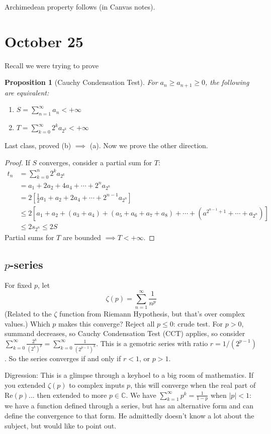 \documentclass{article}
\theoremstyle{plain}
\newtheorem{proposition}{Proposition}
\theoremstyle{remark}
\newcommand{\C}{{\mathbb C}}
\begin{document}
Archimedean property follows (in Canvas notes).

\section{October 25}
Recall we were trying to prove
\begin{proposition}[Cauchy Condensation Test]
	For $a_n \geq a_{n+1} \geq 0$, the following are equivalent:
	\begin{enumerate}
		\item $S = \sum_{n=1}^\infty a_n < + \infty$
		\item $T = \sum_{k=0}^\infty 2^ka_{2^k} < + \infty$
	\end{enumerate}
\end{proposition}
Last class, proved (b) $\implies$ (a). Now we prove the other direction.
\begin{proof}
	If $S$ converges,
	consider a partial sum for $T$:
	\begin{align*}
		t_n
		&= \sum_{k=0}^n 2^ka_{2^k}\\
		&= a_1 + 2a_2 + 4a_4 + \cdots + 2^na_{2^n}\\
		&= 2\left[\frac{1}{2}a_1 + a_2 + 2a_4 + \cdots + 2^{n-1}a_{2^n}\right]\\
		&\leq 2\left[a_1 + a_2 + (a_3 + a_4) + (a_5 + a_6 + a_7 + a_8)
		+ \cdots + (a^{2^{n-1}+1} + \cdots + a_{2^n})\right]\\
		&\leq 2s_{2^n} \leq 2S
	\end{align*}
	Partial sums for $T$ are bounded $\implies T < + \infty$.
\end{proof}
\subsection{$p$-series}
For fixed $p$, let
\[
	\zeta(p) = \sum_{n=1}^\infty \frac{1}{n^p}
\]
(Related to the $\zeta$ function from Riemann Hypothesis,
but that's over complex values.)
Which $p$ makes this converge?
Reject all $p \leq 0$: crude test.
For $p > 0$, summand decreases,
so Cauchy Condensation Test (CCT) applies,
so consider $\sum_{k = 0}^\infty \frac{2^k}{(2^k)^p}
= \sum_{k=0}^\infty \frac{1}{(2^{p-1})^k}$.
This is a gemotric series with ratio $r = 1/(2^{p-1})$.
So the series converges if and only if $r < 1$, or $p > 1$.

Digression: This is a glimpse through a keyhoel to a big room of mathematics.
If you extended $\zeta(p)$ to complex inputs $p$,
this will converge when the real part of $\mathrm{Re}(p)$...
then extended to more $p \in \C$.
We have $\sum_{k=1}^\infty p^k = \frac{1}{1-p}$ when $|p|<1$:
we have a function defined through a series,
but has an alternative form and can define the convergence to that form.
He admittedly doesn't know a lot about the subject, but would like to point out.
\end{document}
